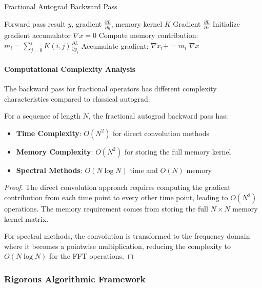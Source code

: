 \begin{algorithm}[h]
\caption{Fractional Autograd Backward Pass}
\begin{algorithmic}[1]
\REQUIRE Forward pass result $y$, gradient $\frac{\partial L}{\partial y}$, memory kernel $K$
\ENSURE Gradient $\frac{\partial L}{\partial x}$
\STATE Initialize gradient accumulator $\nabla x = 0$
    \STATE Compute memory contribution: $m_i = \sum_{j=0}^{i} K(i,j) \frac{\partial L}{\partial y_j}$
    \STATE Accumulate gradient: $\nabla x_i += m_i$
\ENDFOR
\RETURN $\nabla x$
\end{algorithmic}
\end{algorithm}

\paragraph{Computational Complexity Analysis}

The backward pass for fractional operators has different complexity characteristics compared to classical autograd:

\begin{theorem}
For a sequence of length $N$, the fractional autograd backward pass has:
\begin{itemize}
\item \textbf{Time Complexity}: $O(N^2)$ for direct convolution methods
\item \textbf{Memory Complexity}: $O(N^2)$ for storing the full memory kernel
\item \textbf{Spectral Methods}: $O(N \log N)$ time and $O(N)$ memory
\end{itemize}
\end{theorem}

\begin{proof}
The direct convolution approach requires computing the gradient contribution from each time point to every other time point, leading to $O(N^2)$ operations. The memory requirement comes from storing the full $N \times N$ memory kernel matrix.

For spectral methods, the convolution is transformed to the frequency domain where it becomes a pointwise multiplication, reducing the complexity to $O(N \log N)$ for the FFT operations.
\end{proof}

\subsubsection{Rigorous Algorithmic Framework}

